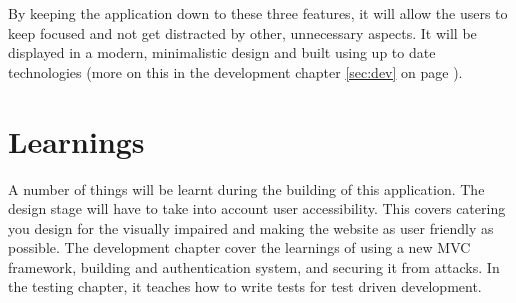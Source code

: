 \noindent
By keeping the application down to these three features, it will allow the users to keep focused and not get distracted by other, unnecessary aspects. It will be displayed in a modern, minimalistic design and built using up to date technologies (more on this in the development chapter \ref{sec:dev} on page \pageref{sec:dev}).\\

\section{Learnings}
A number of things will be learnt during the building of this application. The design stage will have to take into account user accessibility. This covers catering you design for the visually impaired and making the website as user friendly as possible. The development chapter cover the learnings of using a new MVC framework, building and authentication system, and securing it from attacks. In the testing chapter, it teaches how to write tests for test driven development.\\

